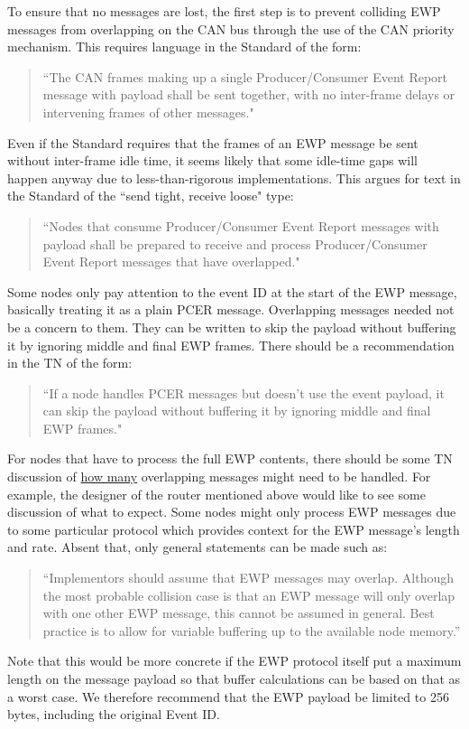 \documentclass[11pt]{article}
\begin{document}
To ensure that no messages are lost,
the first step is to prevent
colliding EWP messages from overlapping on the 
CAN bus through the use of the CAN priority mechanism.  
This requires language in the Standard of the form:
\begin{quote}
    ``The CAN frames making up a single Producer/Consumer Event Report message with payload 
    shall be sent together, with no inter-frame delays 
    or intervening frames of other messages."
\end{quote}

Even if the Standard requires that the frames of an EWP message
be sent without inter-frame idle time, it seems likely that 
some idle-time gaps will happen
anyway due to less-than-rigorous implementations.  
This argues for text in the Standard of the ``send tight, receive loose" type:
\cbstart
\begin{quote}
    ``Nodes that consume Producer/Consumer Event Report messages with payload
    shall be prepared to receive and process Producer/Consumer Event Report messages
    that have overlapped."
\end{quote}
\cbend

Some nodes only pay attention to the event ID at the start of the EWP message, basically
treating it as a plain PCER message.  
Overlapping messages needed not be a concern to them.
They can be written to 
skip the payload without buffering it by ignoring middle and final EWP frames.
There should be a recommendation in the TN of the form:
\begin{quote}
    ``If a node handles PCER messages but doesn't use the event payload, 
    it can skip the payload without buffering it by ignoring middle and final EWP frames."
\end{quote}

For nodes that have to process the full EWP contents, there should be some TN discussion of
\underline{how many}
overlapping messages might need to be handled.
For example, the designer of the router mentioned above would like to see some 
discussion of what to expect.  
Some nodes might only process EWP messages due to some particular protocol
which provides context for the EWP message's length and rate.  
Absent that, only general statements can be made such as:
\cbstart
\begin{quote}
    ``Implementors should assume that EWP messages may overlap. 
    Although the most probable collision case is that an EWP message will only overlap
    with one other EWP message, this cannot be assumed in general.
    Best practice is to allow for variable buffering up to the available node memory.''
\end{quote}
\cbend
Note that this would be more concrete if the EWP protocol itself
put a maximum length on the message payload
so that buffer calculations can be based on that as a worst case.
We therefore recommend that the EWP payload be limited to 256 bytes, including
the original Event ID.
\end{document}

